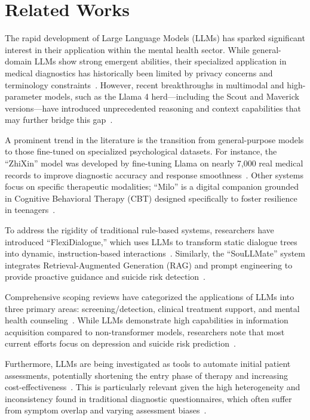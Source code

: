 \documentclass[sigconf]{acmart}
\begin{document}
\section{Related Works}

The rapid development of Large Language Models (LLMs) has sparked significant interest in their application within the mental health sector. While general-domain LLMs show strong emergent abilities, their specialized application in medical diagnostics has historically been limited by privacy concerns and terminology constraints~\cite{zhao_tuning_2024}. However, recent breakthroughs in multimodal and high-parameter models, such as the Llama 4 herd---including the Scout and Maverick versions---have introduced unprecedented reasoning and context capabilities that may further bridge this gap~\cite{noauthor_llama_nodate}.

A prominent trend in the literature is the transition from general-purpose models to those fine-tuned on specialized psychological datasets. For instance, the ``ZhiXin'' model was developed by fine-tuning Llama on nearly 7,000 real medical records to improve diagnostic accuracy and response smoothness~\cite{zhao_tuning_2024}. Other systems focus on specific therapeutic modalities; ``Milo'' is a digital companion grounded in Cognitive Behavioral Therapy (CBT) designed specifically to foster resilience in teenagers~\cite{noauthor_milo_nodate}.

To address the rigidity of traditional rule-based systems, researchers have introduced ``FlexiDialogue,'' which uses LLMs to transform static dialogue trees into dynamic, instruction-based interactions~\cite{fernandes_flexidialogue_2025}. Similarly, the ``SouLLMate'' system integrates Retrieval-Augmented Generation (RAG) and prompt engineering to provide proactive guidance and suicide risk detection~\cite{guo_soullmate_2025}.

Comprehensive scoping reviews have categorized the applications of LLMs into three primary areas: screening/detection, clinical treatment support, and mental health counseling~\cite{noauthor_applications_2025}. While LLMs demonstrate high capabilities in information acquisition compared to non-transformer models, researchers note that most current efforts focus on depression and suicide risk prediction~\cite{noauthor_applications_2025}.

Furthermore, LLMs are being investigated as tools to automate initial patient assessments, potentially shortening the entry phase of therapy and increasing cost-effectiveness~\cite{rosteck_bridging_2025}. This is particularly relevant given the high heterogeneity and inconsistency found in traditional diagnostic questionnaires, which often suffer from symptom overlap and varying assessment biases~\cite{newson_heterogeneity_2020}.
\end{document}

